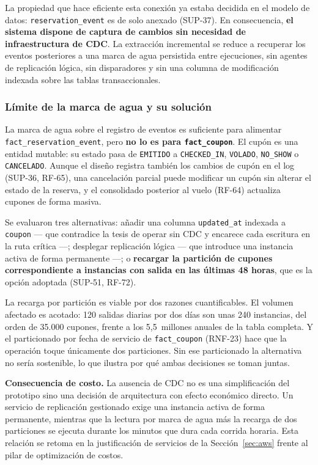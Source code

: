 \documentclass[10pt,letterpaper]{article}
\newcommand{\nota}[1]{%
  \begin{tcolorbox}[colback=cajaFondo,colframe=usaAzul!60,sharp corners=south]#1\end{tcolorbox}}
\begin{document}
La propiedad que hace eficiente esta conexión ya estaba decidida en el modelo de datos: \texttt{reservation\_event} es de solo anexado (SUP-37). En consecuencia, \textbf{el sistema dispone de captura de cambios sin necesidad de infraestructura de CDC}. La extracción incremental se reduce a recuperar los eventos posteriores a una marca de agua persistida entre ejecuciones, sin agentes de replicación lógica, sin disparadores y sin una columna de modificación indexada sobre las tablas transaccionales.

\subsubsection{Límite de la marca de agua y su solución}
La marca de agua sobre el registro de eventos es suficiente para alimentar \texttt{fact\_reservation\_event}, pero \textbf{no lo es para \texttt{fact\_coupon}}. El cupón es una entidad mutable: su estado pasa de \texttt{EMITIDO} a \texttt{CHECKED\_IN}, \texttt{VOLADO}, \texttt{NO\_SHOW} o \texttt{CANCELADO}. Aunque el diseño registra también los cambios de cupón en el log (SUP-36, RF-65), una cancelación parcial puede modificar un cupón sin alterar el estado de la reserva, y el consolidado posterior al vuelo (RF-64) actualiza cupones de forma masiva.

Se evaluaron tres alternativas: añadir una columna \texttt{updated\_at} indexada a \texttt{coupon} --- que contradice la tesis de operar sin CDC y encarece cada escritura en la ruta crítica ---; desplegar replicación lógica --- que introduce una instancia activa de forma permanente ---; o \textbf{recargar la partición de cupones correspondiente a instancias con salida en las últimas 48 horas}, que es la opción adoptada (SUP-51, RF-72).

La recarga por partición es viable por dos razones cuantificables. El volumen afectado es acotado: 120 salidas diarias por dos días son unas 240 instancias, del orden de 35.000 cupones, frente a los 5{,}5~millones anuales de la tabla completa. Y el particionado por fecha de servicio de \texttt{fact\_coupon} (RNF-23) hace que la operación toque únicamente dos particiones. Sin ese particionado la alternativa no sería sostenible, lo que ilustra por qué ambas decisiones se toman juntas.

\nota{\textbf{Consecuencia de costo.} La ausencia de CDC no es una simplificación del prototipo sino una decisión de arquitectura con efecto económico directo. Un servicio de replicación gestionado exige una instancia activa de forma permanente, mientras que la lectura por marca de agua más la recarga de dos particiones se ejecuta durante los minutos que dura cada corrida horaria. Esta relación se retoma en la justificación de servicios de la Sección~\ref{sec:aws} frente al pilar de optimización de costos.}
\end{document}
